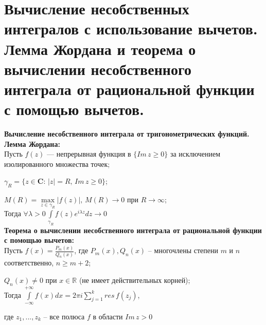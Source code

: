 \newpage 
\section{Вычисление несобственных интегралов с использование вычетов. Лемма Жордана и теорема о вычислении несобственного интеграла от рациональной функции с помощью вычетов.}

\textbf{Вычисление несобственного интеграла от тригонометрических функций.}\\[2mm]


\textbf{Лемма Жордана:}\\[2mm]
Пусть  $f(z)$ --- непрерывная функция в $\{Im\,z \geq 0\}$ за исключением изолированного множества точек;

$\gamma_{R} =\{z\in\mathbf{C}: \, |z|=R, \, Im\,z\geq 0\}$;

$M(R)=\underset{z\in \gamma_{R}}{\max}|f(z)|, \, M(R) \rightarrow 0$ при $R\rightarrow \infty$;\\[2mm]
Тогда $\forall \lambda > 0 \, \int\limits_{\gamma_{R}} f(z)e^{i\lambda z}dz\rightarrow 0$\\[4mm]

\textbf{Теорема о вычислении несобственного интеграла от рациональной функции с помощью вычетов:}\\[2mm]
Пусть  $f(x)=\frac{P_m(x)}{Q_n(x)}$, где $P_m(x), Q_n(x)$ -- многочлены степени $m$ и $n$ соответственно, $n\geq m+2$;

$Q_n(x)\neq 0$ при $x \in \mathbb{R}$ (не имеет действительных корней);\\[2mm]
Тогда $\int\limits_{-\infty}^{+\infty}f(x)dx=2\pi i \sum_{j=1}^k res\,f(z_j)$, 

где $z_1, ...,z_k$ -- все полюса $f$ в области $Im\,z >0$\\[2mm]

